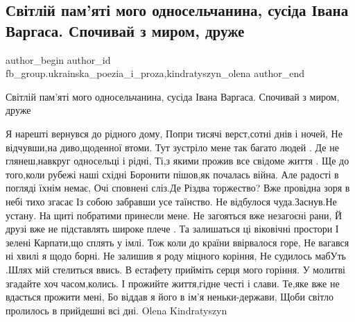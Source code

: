  
 
 
 
 

\subsection{Світлій пам'яті мого односельчанина, сусіда Івана Варгаса. Спочивай з миром, друже}
\label{sec:10_01_2023.fb.fb_group.ukrainska_poezia_i_proza.1.sv_tl_i_pam_yat__mog}
 
\ifcmt
 author_begin
   author_id fb_group.ukrainska_poezia_i_proza,kindratyszyn_olena
 author_end
\fi

Світлій пам'яті мого односельчанина, сусіда Івана Варгаса. Спочивай з миром, друже

\obeycr
Я нарешті вернувся до рідного дому, 
Попри тисячі верст,сотні днів і ночей,
Не відчувши,на диво,щоденної втоми.
Тут зустріло мене так багато людей .
Де не глянеш,навкруг односельці і рідні,
Ті,з якими прожив все свідоме життя .
Ще до того,коли рубежі наші східні 
Боронити пішов,як почалась війна.
Але радості в погляді їхнім немає, 
Очі сповнені сліз.Де Різдва торжество?
Вже провідна зоря в небі тихо згасає
Із собою забравши усе таїнство.
Не відбулося чуда.Заснув.Не устану.
На щиті побратими принесли мене.
Не загояться вже незагоєні рани,
Й друзі вже не підставлять широке плече .
Та залишаться ці віковічні простори
І зелені Карпати,що сплять у імлі.
Тож коли до країни ввірвалося горе,
Не вагався ні хвилі я щодо борні.
Не залишив я роду міцного коріння,
Не судилось мабУть .Шлях мій стелиться ввись.
В естафету прийміть серця мого горіння.
У молитві згадайте хоч часом,колись.
І прожийте життя,гідне честі і слави.
Те,яке вже не вдасться прожити мені,
Бо віддав я його в ім'я неньки-держави,
Щоби світло пролилось в прийдешні всі дні.
Olena Kindratyszyn
\restorecr
